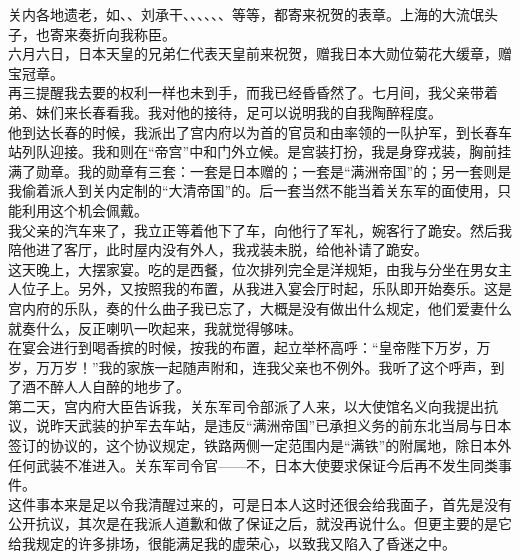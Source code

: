 关内各地遗老，如、、刘承干、、、、、、等等，都寄来祝贺的表章。上海的大流氓头子，也寄来奏折向我称臣。\\

六月六日，日本天皇的兄弟仁代表天皇前来祝贺，赠我日本大勋位菊花大缓章，赠宝冠章。\\

再三提醒我去要的权利一样也未到手，而我已经昏昏然了。七月间，我父亲带着弟、妹们来长春看我。我对他的接待，足可以说明我的自我陶醉程度。\\

他到达长春的时候，我派出了宫内府以为首的官员和由率领的一队护军，到长春车站列队迎接。我和则在“帝宫”中和门外立候。是宫装打扮，我是身穿戎装，胸前挂满了勋章。我的勋章有三套：一套是日本赠的；一套是“满洲帝国”的；另一套则是我偷着派人到关内定制的“大清帝国”的。后一套当然不能当着关东军的面使用，只能利用这个机会佩戴。\\

我父亲的汽车来了，我立正等着他下了车，向他行了军礼，婉客行了跪安。然后我陪他进了客厅，此时屋内没有外人，我戎装未脱，给他补请了跪安。\\

这天晚上，大摆家宴。吃的是西餐，位次排列完全是洋规矩，由我与分坐在男女主人位子上。另外，又按照我的布置，从我进入宴会厅时起，乐队即开始奏乐。这是宫内府的乐队，奏的什么曲子我已忘了，大概是没有做出什么规定，他们爱妻什么就奏什么，反正喇叭一吹起来，我就觉得够味。\\

在宴会进行到喝香摈的时候，按我的布置，起立举杯高呼：“皇帝陛下万岁，万岁，万万岁！”我的家族一起随声附和，连我父亲也不例外。我听了这个呼声，到了酒不醉人人自醉的地步了。\\

第二天，宫内府大臣告诉我，关东军司令部派了人来，以大使馆名义向我提出抗议，说昨天武装的护军去车站，是违反“满洲帝国”已承担义务的前东北当局与日本签订的协议的，这个协议规定，铁路两侧一定范围内是“满铁”的附属地，除日本外任何武装不准进入。关东军司令官——不，日本大使要求保证今后再不发生同类事件。\\

这件事本来是足以令我清醒过来的，可是日本人这时还很会给我面子，首先是没有公开抗议，其次是在我派人道歉和做了保证之后，就没再说什么。但更主要的是它给我规定的许多排场，很能满足我的虚荣心，以致我又陷入了昏迷之中。\\

